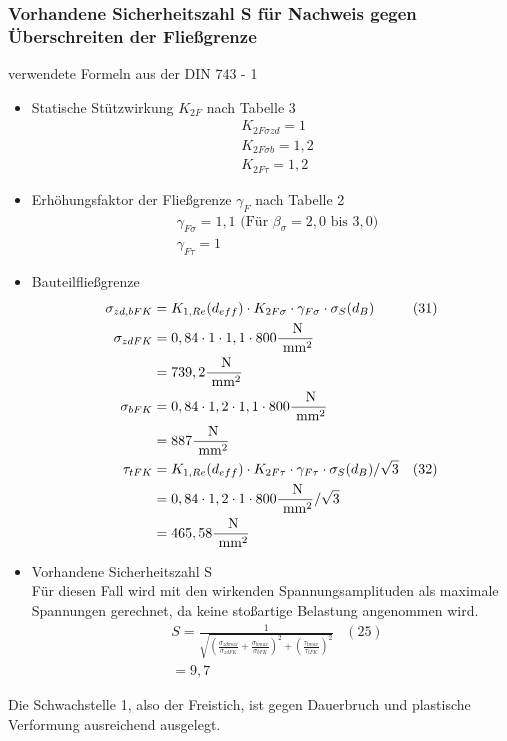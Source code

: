 \subsubsection{Vorhandene Sicherheitszahl S für Nachweis gegen Überschreiten der Fließgrenze}
verwendete Formeln aus der DIN 743 - 1
\begin{itemize}
	\item Statische Stützwirkung $K_{2F}$ nach Tabelle 3
	\begin{align*}
	&K_{2F \sigma zd} = 1 \\
	&K_{2F \sigma b} = 1,2 \\
	&K_{2F \tau} = 1,2 
	\end{align*}
	\item Erhöhungsfaktor der Fließgrenze $\gamma_{F}$ nach Tabelle 2
	\begin{align*}
	&\gamma_{F\sigma} = 1,1 \text{ (Für } \beta_{\sigma} = 2,0 \text{ bis } 3,0 \text{)} \\
	&\gamma_{F\tau} = 1 
	\end{align*}
	\item Bauteilfließgrenze
	\begin{align*}
	\sigma_{zd,bFK} &= K_{1,Re} (d_{eff}) \cdot K_{2F \sigma} \cdot \gamma_{F\sigma} \cdot \sigma_S (d_B) & (31) \\
	\sigma_{zdFK}&= 0,84 \cdot 1 \cdot 1,1 \cdot 800 \frac{\text{ N}}{\text{ mm}^2} \\
	&= 739,2 \frac{\text{ N}}{\text{ mm}^2}\\
	\sigma_{bFK}&= 0,84 \cdot 1,2 \cdot 1,1 \cdot 800 \frac{\text{ N}}{\text{ mm}^2} \\
	&= 887\frac{\text{ N}}{\text{ mm}^2}\\
	\tau_{tFK} &= K_{1,Re} (d_{eff}) \cdot K_{2F \tau} \cdot \gamma_{F\tau} \cdot \sigma_S (d_B) / \sqrt{3} &(32) \\
	&= 0,84 \cdot 1,2 \cdot 1 \cdot 800 \frac{\text{ N}}{\text{ mm}^2} / \sqrt{3}\\
	&= 465,58 \frac{\text{ N}}{\text{ mm}^2}
	\end{align*}
	\item Vorhandene Sicherheitszahl S \\
	Für diesen Fall wird mit den wirkenden Spannungsamplituden als maximale Spannungen gerechnet, da keine stoßartige Belastung angenommen wird. 
	\begin{align*}
	&S = \frac{1}{\sqrt{\left( \frac{\sigma_{zdmax}}{\sigma_{zdFK}}+\frac{\sigma_{bmax}}{\sigma_{bFK}} \right)^2 +\left( \frac{\tau_{tmax}}{\tau_{tFK}} \right)^2 }} & (25)\\
	&= 9,7 
	\end{align*}
\end{itemize}
Die Schwachstelle 1, also der Freistich, ist gegen Dauerbruch und plastische Verformung ausreichend ausgelegt.